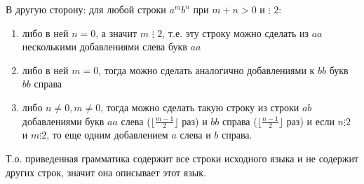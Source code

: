 \documentclass[12pt,a4paper]{scrartcl}
\begin{document}
\begin{description}
	В другую сторону: для любой строки $a^mb^n$ при $m+n > 0$ и $\vdots \,\, 2$:
	
	\begin{enumerate}
		\item либо в ней $n=0$, а значит $m \,\,\vdots\,\,2$, т.е. эту строку можно сделать из $aa$ несколькими добавлениями слева букв $aa$
		\item либо в ней $m=0$, тогда можно сделать аналогично добавлениями к $bb$ букв $bb$ справа
		\item либо $n \neq 0, m \neq 0$, тогда можно сделать такую строку из строки $ab$ добавлениями букв $aa$ слева ($\lfloor\frac{m-1}{2}\rfloor$ раз) и $bb$ справа ($\lfloor\frac{n-1}{2}\rfloor$ раз) и если $n \vdots 2$ и $m \vdots 2$, то еще одним добавлением $a$ слева и $b$ справа.
	\end{enumerate}

	Т.о. приведенная грамматика содержит все строки исходного языка и не содержит других строк, значит она описывает этот язык.
	
	
\end{description}
\end{document}
